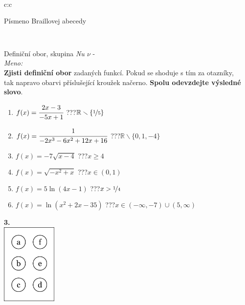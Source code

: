 \documentclass[10pt]{report}
\begin{document}
\begin{tabular}{c:c}
\begin{minipage}[c][99mm][t]{0.49\linewidth}
\begin{center}
\begin{minipage}{0.20\linewidth}
\begin{center}
{\small Písmeno Braillovej abecedy}
\end{center}
\end{minipage}
\end{center}
\end{minipage}
\\ \hdashline
\begin{minipage}[c][99mm][t]{0.49\linewidth}
\begin{center}
\vspace{7mm}
{\huge Definiční obor, skupina \textit{Nu $\nu$} -}\\[4.5mm]
\textit{Meno:}\phantom{xxxxxxxxxxxxxxxxxxxxxxxxxxxxxxxxxxxxxxxxxxxxxxxxxxxxxxxxxxxxxxxxx}\\[3.5mm]
\textbf{Zjisti definiční obor} zadaných funkcí. Pokud se shoduje s tím za otazníky,\\tak napravo obarvi příslušející kroužek načerno. \textbf{Spolu odevzdejte výsledné slovo}.\\[3mm]
\begin{minipage}{0.77\linewidth}
\begin{center}
\begin{varwidth}{\textwidth}
\begin{enumerate}
\normalsize
\item $f(x)=\cfrac{2x-3}{-5x+1}$\quad \dotfill\; ???\;\dotfill \quad $\mathbb{R}\smallsetminus\{\nicefrac{1}{5}\}$
\item $f(x)=\cfrac{1}{-2x^3-6x^2+12x+16}$\quad \dotfill\; ???\;\dotfill \quad $\mathbb{R}\smallsetminus\{0,1,-4\}$
\item $f(x)=-7\sqrt{x-4}$\quad \dotfill\; ???\;\dotfill \quad $x\geq4$
\item $f(x)=\sqrt{-x^2+x}$\quad \dotfill\; ???\;\dotfill \quad $x\in(0 , 1)$
\item $f(x)=5\ln{(4x-1)}$\quad \dotfill\; ???\;\dotfill \quad $x>\nicefrac{1}{4}$
\item $f(x)=\ln{(x^2+2x-35)}$\quad \dotfill\; ???\;\dotfill \quad $x\in(-\infty , -7)\cup(5 , \infty)$
\end{enumerate}
\end{varwidth}
\end{center}
\end{minipage}
\begin{minipage}{0.20\linewidth}
\begin{center}
{\Huge\bfseries 3.} \\[2mm]
\includegraphics[height=40mm]{../images/braille.png}

\end{center}
\end{minipage}
\end{center}
\end{minipage}
\end{tabular}
\end{document}
